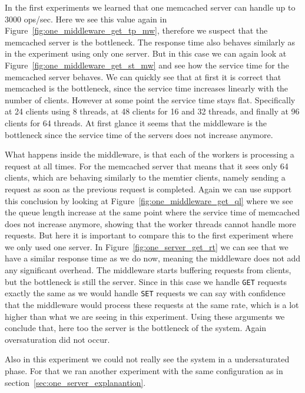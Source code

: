 \documentclass[11pt,a4paper]{article}
\begin{document}
%
In the first experiments we learned that one memcached server can handle up to 3000 ops/sec.
%
Here we see this value again in Figure~\ref{fig:one_middleware_get_tp_mw}, therefore we suspect that the memcached server is the bottleneck.
%
The response time also behaves similarly as in the experiment using only one server.
%
But in this case we can again look at Figure~\ref{fig:one_middleware_get_st_mw} and see how the service time for the memcached server behaves.
%
We can quickly see that at first it is correct that memcached is the bottleneck, since the service time increases linearly with the number of clients.
%
However at some point the service time stays flat.
%
Specifically at 24 clients using 8 threads, at 48 clients for 16 and 32 threads, and finally at 96 clients for 64 threads.
%
At first glance it seems that the middleware is the bottleneck since the service time of the servers does not increase anymore.
%
\par
What happens inside the middleware, is that each of the workers is processing a request at all times. 
%
For the memcached server that means that it sees only 64 clients, which are behaving similarly to the memtier clients, namely sending a request as soon as the previous request is completed.
%
Again we can use support this conclusion by looking at Figure~\ref{fig:one_middleware_get_ql} where we see the queue length increase at the same point where the service time of memcached does not increase anymore, showing that the worker threads cannot handle more requests.
%
But here it is important to compare this to the first experiment where we only used one server.
%
In Figure~\ref{fig:one_server_get_rt} we can see that we have a similar response time as we do now, meaning the middleware does not add any significant overhead.
%
The middleware starts buffering requests from clients, but the bottleneck is still the server.
%
Since in this case we handle \texttt{GET} requests exactly the same as we would handle \texttt{SET} requests we can say with confidence that the middleware would process these requests at the same rate, which is a lot higher than what we are seeing in this experiment.
%
Using these arguments we conclude that, here too the server is the bottleneck of the system.
%
Again oversaturation did not occur.
%
\par
%
Also in this experiment we could not really see the system in a undersaturated phase.
%
For that we ran another experiment with the same configuration as in section~\ref{sec:one_server_explanantion}.
%
\end{document}
